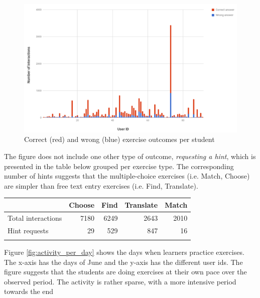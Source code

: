   \begin{figure}[h!]
  \centering
    \includegraphics[width=0.9\columnwidth]{figures/exercise_interactions_count.png}
    \caption{Correct (red) and wrong (blue) exercise outcomes per student}
    \label{fig:ex_interactions}
  \end{figure}

The figure does not include one other type of outcome, {\em requesting a hint}, which is presented in the table below grouped per exercise type. The corresponding number of hints suggests that the multiple-choice exercises (i.e. Match, Choose) are simpler than free text entry exercises (i.e. Find, Translate).

\begin{tabular}{lrrrr}
                      & Choose  & Find & Translate & Match \\ \hline
  Total interactions  & 7180    & 6249 & 2643      & 2010\\
  Hint requests       & 29      & 529  & 847       & 16 \\ \hline
  \label{tab:hints_per_ex_type}
\end{tabular}

Figure \ref{fig:activity_per_day} shows the days when learners practice exercises. The x-axis has the days of June and the y-axis has the different user ids. The figure suggests that the students are doing exercises at their own pace over the observed period. The activity is rather sparse, with a more intensive period towards the end 

